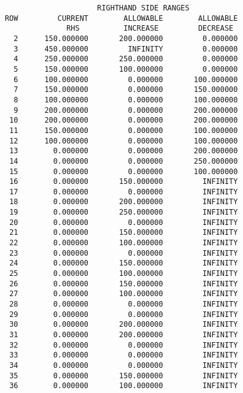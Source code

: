 \begin{verbatim}
                           RIGHTHAND SIDE RANGES
      ROW         CURRENT        ALLOWABLE        ALLOWABLE
                    RHS          INCREASE         DECREASE
        2      150.000000       200.000000         0.000000
        3      450.000000         INFINITY         0.000000
        4      250.000000       250.000000         0.000000
        5      150.000000       100.000000         0.000000
        6      100.000000         0.000000       100.000000
        7      150.000000         0.000000       150.000000
        8      100.000000         0.000000       100.000000
        9      200.000000         0.000000       200.000000
       10      200.000000         0.000000       200.000000
       11      150.000000         0.000000       100.000000
       12      100.000000         0.000000       100.000000
       13        0.000000         0.000000       200.000000
       14        0.000000         0.000000       250.000000
       15        0.000000         0.000000       100.000000
       16        0.000000       150.000000         INFINITY
       17        0.000000         0.000000         INFINITY
       18        0.000000       200.000000         INFINITY
       19        0.000000       250.000000         INFINITY
       20        0.000000         0.000000         INFINITY
       21        0.000000       150.000000         INFINITY
       22        0.000000       100.000000         INFINITY
       23        0.000000         0.000000         INFINITY
       24        0.000000       150.000000         INFINITY
       25        0.000000       100.000000         INFINITY
       26        0.000000       150.000000         INFINITY
       27        0.000000       100.000000         INFINITY
       28        0.000000         0.000000         INFINITY
       29        0.000000         0.000000         INFINITY
       30        0.000000       200.000000         INFINITY
       31        0.000000       200.000000         INFINITY
       32        0.000000         0.000000         INFINITY
       33        0.000000         0.000000         INFINITY
       34        0.000000         0.000000         INFINITY
       35        0.000000       150.000000         INFINITY
       36        0.000000       100.000000         INFINITY

\end{verbatim}

